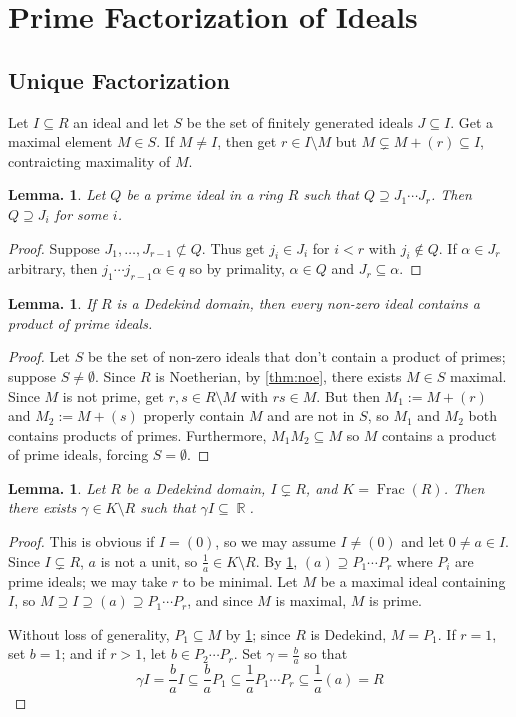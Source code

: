 \documentclass[11pt, a4paper]{memoir}
\DeclareMathOperator{\R}{{\mathbb{R}}}
\theoremstyle{change}
\newtheorem{lemma}[theorem]{Lemma.}
\theoremstyle{plain}
\theoremstyle{nonumberplain}
\newtheorem{proof}{Proof}
\DeclareMathOperator{\Frac}{Frac}
\numberwithin{equation}{section}
\begin{document}
\section{Prime Factorization of Ideals}
\subsection{Unique Factorization}
Let $I\subseteq R$ an ideal and let $S$ be the set of finitely generated ideals $J\subseteq I$.
Get a maximal element $M\in S$.
If $M\neq I$, then get $r\in I\setminus M$ but $M\subsetneq M+(r)\subseteq I$, contraicting maximality of $M$.
\begin{lemma}\label{lem:id-cont}
    Let $Q$ be a prime ideal in a ring $R$ such that $Q\supseteq J_1\cdots J_r$.
    Then $Q\supseteq J_i$ for some $i$.
\end{lemma}
\begin{proof}
    Suppose $J_1,\ldots,J_{r-1}\not\subset Q$.
    Thus get $j_i\in J_i$ for $i<r$ with $j_i\notin Q$.
    If $\alpha\in J_r$ arbitrary, then $j_1\cdots j_{r-1}\alpha\in q$ so by primality, $\alpha\in Q$ and $J_r\subseteq\alpha$.
\end{proof}
\begin{lemma}\label{lem:prod-id}
    If $R$ is a Dedekind domain, then every non-zero ideal contains a product of prime ideals.
\end{lemma}
\begin{proof}
    Let $S$ be the set of non-zero ideals that don't contain a product of primes; suppose $S\neq\emptyset$.
    Since $R$ is Noetherian, by \cref{thm:noe}, there exists $M\in S$ maximal.
    Since $M$ is not prime, get $r,s\in R\setminus M$ with $rs\in M$.
    But then $M_1:=M+(r)$ and $M_2:=M+(s)$ properly contain $M$ and are not in $S$, so $M_1$ and $M_2$ both contains products of primes.
    Furthermore, $M_1M_2\subseteq M$ so $M$ contains a product of prime ideals, forcing $S=\emptyset$.
\end{proof}
\begin{lemma}\label{lem:id-frac}
    Let $R$ be a Dedekind domain, $I\subsetneq R$, and $K=\Frac(R)$.
    Then there exists $\gamma\in K\setminus R$ such that $\gamma I\subseteq\R$.
\end{lemma}
\begin{proof}
    This is obvious if $I=(0)$, so we may assume $I\neq(0)$ and let $0\neq a\in I$.
    Since $I\subsetneq R$, $a$ is not a unit, so $\frac{1}{a}\in K\setminus R$.
    By \cref{lem:prod-id}, $(a)\supseteq P_1\cdots P_r$ where $P_i$ are prime ideals; we may take $r$ to be minimal.
    Let $M$ be a maximal ideal containing $I$, so $M\supseteq I\supseteq(a)\supseteq P_1\cdots P_r$, and since $M$ is maximal, $M$ is prime.

    Without loss of generality, $P_1\subseteq M$ by \cref{lem:id-cont}; since $R$ is Dedekind, $M=P_1$.
    If $r=1$, set $b=1$; and if $r>1$, let $b\in P_2\cdots P_r$.
    Set $\gamma=\frac{b}{a}$ so that
    \begin{equation*}
        \gamma I=\frac{b}{a}I\subseteq\frac{b}{a}P_1\subseteq\frac{1}{a}P_1\cdots P_r\subseteq\frac{1}{a}(a)=R
    \end{equation*}
\end{proof}
\end{document}
